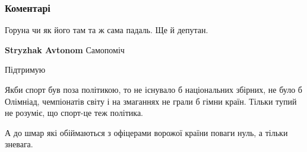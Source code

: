  
 
 
 
 
\subsubsection{Коментарі}

\begin{itemize}
 
Горуна чи як його там та ж сама падаль. Ще й депутан.

\begin{itemize}
 
\textbf{Stryzhak Avtonom} Самопоміч
\end{itemize}

 
Підтримую

 

Якби спорт був поза політикою, то не існувало б національних збірних, не було б
Олімніад, чемпіонатів світу і на змаганнях не грали б гімни країн. Тільки тупий
не розуміє, що спорт-це теж політика.

А до шмар які обіймаються з офіцерами ворожої країни поваги нуль, а тільки
зневага.


\end{itemize}
